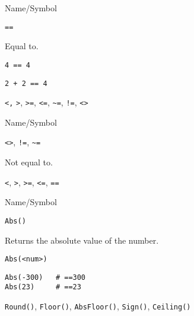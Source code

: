 \begin{desc}{Name/Symbol}

\item[Name/Symbol] 	\verb+==+                   

\item[Description] 	Equal to.

\item[Usage]       	\verb+4 == 4+
		

\item[Example]
\begin{verbatim}
2 + 2 == 4
\end{verbatim}

\item[See Also]     	\verb+<,+ \verb+>+, \verb+>=+, \verb+<=+, \verb+~=+, \verb+!=+, \verb+<>+
\end{desc}



\begin{desc}{Name/Symbol}
\item[Name/Symbol]  	\verb+<>+, \verb+!=+, \verb+~=+

\item[Description]  	Not equal to.

\item[Usage]		

\item[Example]	

\item[See Also]     	\verb+<+, \verb+>+, \verb+>=+, \verb+<=+, \verb+==+

\end{desc}

\vfill
\newpage
{} 
\vfill

\begin{desc}{Name/Symbol}

\item[Name/Symbol] 	\verb+Abs()+

\item[Description]   	Returns the absolute value of the number.

\item[Usage]
\begin{verbatim}
Abs(<num>)
\end{verbatim}        

\item[Example]
\begin{verbatim}
Abs(-300)  	# ==300
Abs(23)    	# ==23
\end{verbatim}

\item[See Also]     	\verb+Round()+, \verb+Floor()+, \verb+AbsFloor()+, \verb+Sign()+, \verb+Ceiling()+
\end{desc}




